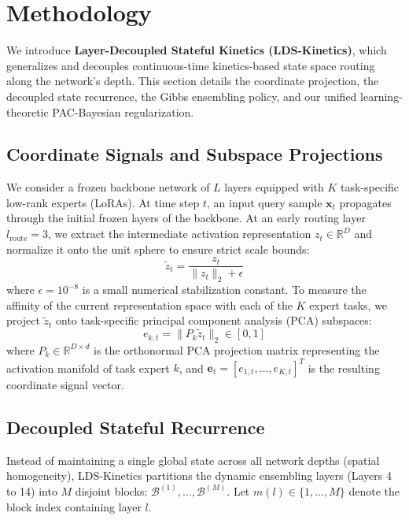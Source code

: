 \section{Methodology}
\label{submission:sec:methodology}

We introduce \textbf{Layer-Decoupled Stateful Kinetics (LDS-Kinetics)}, which generalizes and decouples continuous-time kinetics-based state space routing along the network's depth. This section details the coordinate projection, the decoupled state recurrence, the Gibbs ensembling policy, and our unified learning-theoretic PAC-Bayesian regularization.

\subsection{Coordinate Signals and Subspace Projections}
We consider a frozen backbone network of $L$ layers equipped with $K$ task-specific low-rank experts (LoRAs). At time step $t$, an input query sample $\mathbf{x}_t$ propagates through the initial frozen layers of the backbone. At an early routing layer $l_{\text{route}} = 3$, we extract the intermediate activation representation $z_t \in \mathbb{R}^D$ and normalize it onto the unit sphere to ensure strict scale bounds:
\begin{equation}
    \tilde{z}_t = \frac{z_t}{\|z_t\|_2 + \epsilon}
\end{equation}
where $\epsilon = 10^{-8}$ is a small numerical stabilization constant. To measure the affinity of the current representation space with each of the $K$ expert tasks, we project $\tilde{z}_t$ onto task-specific principal component analysis (PCA) subspaces:
\begin{equation}
    e_{k, t} = \|P_k \tilde{z}_t\|_2 \in [0, 1]
\end{equation}
where $P_k \in \mathbb{R}^{D \times d}$ is the orthonormal PCA projection matrix representing the activation manifold of task expert $k$, and $\mathbf{e}_t = [e_{1, t}, \dots, e_{K, t}]^T$ is the resulting coordinate signal vector.

\subsection{Decoupled Stateful Recurrence}
Instead of maintaining a single global state across all network depths (spatial homogeneity), LDS-Kinetics partitions the dynamic ensembling layers (Layers 4 to 14) into $M$ disjoint blocks: $\mathcal{B}^{(1)}, \dots, \mathcal{B}^{(M)}$. Let $m(l) \in \{1, \dots, M\}$ denote the block index containing layer $l$. 

